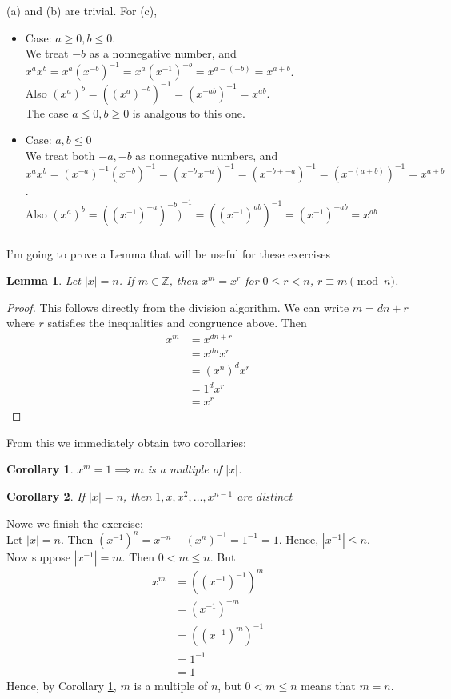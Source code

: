 \documentclass{article}
\newcommand{\ints}{\mathbb{Z}}
\newcommand{\inv}[1]{ {#1}^{-1} }
\newtheorem{corollary}{Corollary}[theorem]
\newtheorem{lemma}[theorem]{Lemma}
\begin{document}
\subsubsection{}
(a) and (b) are trivial. For (c), 
\begin{itemize}
\item Case: $a \geq 0, b \leq 0$.\\
We treat $-b$ as a nonnegative number, and $x^ax^b = x^a\inv{(x^{-b})} = x^a(\inv{x})^{-b} = x^{a-(-b)} = x^{a+b}$.\\
Also $(x^a)^b = \inv{( (x^a)^{-b} )} = \inv{( x^{-ab}  )} = x^{ab}$. \\
The case $a \leq 0, b \geq 0$ is analgous to this one.
\item Case: $a,b \leq 0$\\
We treat both $-a,-b$ as nonnegative numbers, and $x^ax^b = \inv{(x^{-a})}\inv{(x^{-b})} = \inv{( x^{-b}x^{-a} )} = \inv{( x^{-b + -a})} = \inv{( x^{-(a+b)} )} = x^{a+b}$.\\
Also $(x^a)^b = \inv{( (\inv{x})^{-a})^{-b} )} = \inv{( (\inv{x})^{ab} )} = (\inv{x})^{-ab} = x^{ab}$
\end{itemize}
\subsubsection{}\label{ex20}
I'm going to prove a Lemma that will be useful for these exercises
\begin{lemma} \label{lemma1}
Let $|x|=n$. If $m \in \ints$, then $x^m = x^r$ for $0 \leq r < n$, $r \equiv m \pmod{n}$.
\end{lemma}
\begin{proof}
This follows directly from the division algorithm. We can write $m = dn+r$ where $r$ satisfies the inequalities and congruence above. Then
\begin{align*}
x^m &= x^{dn+r}\\
&= x^{dn}x^r\\
&= (x^n)^dx^r\\
&= 1^d x^r\\
&= x^r
\end{align*}
\end{proof}
From this we immediately obtain two corollaries:
\begin{corollary} \label{cor1p1}
$x^m = 1 \implies m$ is a multiple of $|x|$. 
\end{corollary}
\begin{corollary} \label{cor1p2}
If $|x| = n$, then $1,x,x^2,\ldots,x^{n-1}$ are distinct
\end{corollary}
Nowe we finish the exercise:\\
Let $|x| = n$. Then $(\inv{x})^n = x^{-n} - \inv{(x^n)} = \inv{1} = 1$. Hence, $|\inv{x}| \leq n$. \\
Now suppose $|\inv{x}| = m$. Then $0 < m \leq n$. But
\begin{align*}
x^m &= (\inv{(\inv{x})})^m\\
&= (\inv{x})^{-m}\\
&= \inv{((\inv{x})^m)}\\
&= \inv{1}\\
&= 1
\end{align*}
Hence, by Corollary \ref{cor1p1}, $m$ is a multiple of $n$, but $0 < m \leq n$ means that $m = n$.
\end{document}
